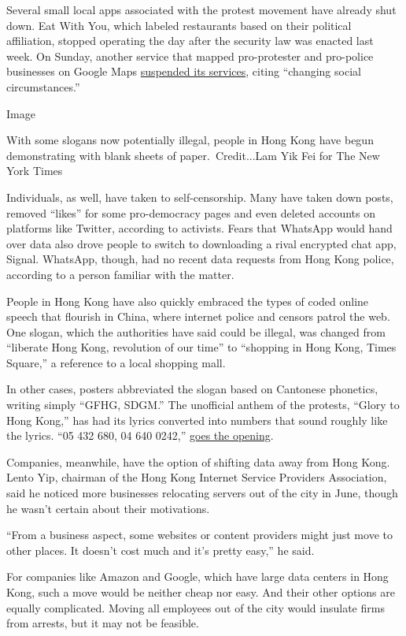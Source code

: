 Several small local apps associated with the protest movement have
already shut down. Eat With You, which labeled restaurants based on
their political affiliation, stopped operating the day after the
security law was enacted last week. On Sunday, another service that
mapped pro-protester and pro-police businesses on Google Maps
\href{https://t.me/yellowshoppromotion/1044}{suspended its services},
citing ``changing social circumstances.''

Image

With some slogans now potentially illegal, people in Hong Kong have
begun demonstrating with blank sheets of paper.~Credit...Lam Yik Fei for
The New York Times

Individuals, as well, have taken to self-censorship. Many have taken
down posts, removed ``likes'' for some pro-democracy pages and even
deleted accounts on platforms like Twitter, according to activists.
Fears that WhatsApp would hand over data also drove people to switch to
downloading a rival encrypted chat app, Signal. WhatsApp, though, had no
recent data requests from Hong Kong police, according to a person
familiar with the matter.

People in Hong Kong have also quickly embraced the types of coded online
speech that flourish in China, where internet police and censors patrol
the web. One slogan, which the authorities have said could be illegal,
was changed from ``liberate Hong Kong, revolution of our time'' to
``shopping in Hong Kong, Times Square,'' a reference to a local shopping
mall.

In other cases, posters abbreviated the slogan based on Cantonese
phonetics, writing simply ``GFHG, SDGM.'' The unofficial anthem of the
protests, ``Glory to Hong Kong,'' has had its lyrics converted into
numbers that sound roughly like the lyrics. ``05 432 680, 04 640 0242,''
\href{https://www.facebook.com/glorytohkdgx/posts/199562861505570}{goes
the opening}.

Companies, meanwhile, have the option of shifting data away from Hong
Kong. Lento Yip, chairman of the Hong Kong Internet Service Providers
Association, said he noticed more businesses relocating servers out of
the city in June, though he wasn't certain about their motivations.

``From a business aspect, some websites or content providers might just
move to other places. It doesn't cost much and it's pretty easy,'' he
said.

For companies like Amazon and Google, which have large data centers in
Hong Kong, such a move would be neither cheap nor easy. And their other
options are equally complicated. Moving all employees out of the city
would insulate firms from arrests, but it may not be feasible.

